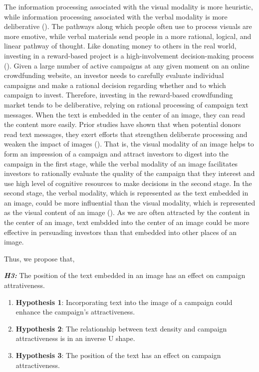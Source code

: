 \documentclass[a4paper]{article}
\begin{document}
The information processing associated with the visual modality is more heuristic, while information processing associated with the verbal modality is more deliberative (\cite{kim_effects_2008}). The pathways along which people often use to process visuals are more emotive, while verbal materials send people in a more rational, logical, and linear pathway of thought. Like donating money to others in the real world, investing in a reward-based project is a high-involvement decision-making process (\cite{zhao_multi-modal_2022}). Given a large number of active campaigns at any given moment on an online crowdfunding website, an investor needs to carefully evaluate individual campaigns and make a rational decision regarding whether and to which campaign to invest. Therefore, investing in the reward-based crowdfunding market tends to be deliberative, relying on rational processing of campaign text messages. When the text is embedded in the center of an image, they can read the content more easily. Prior studies have shown that when potential donors read text messages, they exert efforts that strengthen deliberate processing and weaken the impact of images (\cite{small_face_2009}). That is, the visual modality of an image helps to form an impression of a campaign and attract investors to digest into the campaign in the first stage, while the verbal modality of an image facilitates investors to rationally evaluate the quality of the campaign that they interest and use high level of cognitive resources to make decisions in the second stage. In the second stage, the verbal modality, which is represented as the text embedded in an image, could be more influential than the visual modality, which is represented as the visual content of an image (\cite{zhao_multi-modal_2022}). As we are often attracted by the content in the center of an image, text embdded into the center of an image could be more effective in persuading investors than that embedded into other places of an image. 

Thus, we propose that, 

\textit{\textbf{H3:}} The position of the text embedded in an image has an effect on campaign attrativeness.

\begin{enumerate}
    \item \textbf{Hypothesis 1}: Incorporating text into the image of a campaign could enhance the campaign's attractiveness. 
    \item  \textbf{Hypothesis 2}: The relationship between text density and campaign attractiveness is in an inverse U shape. 
    \item  \textbf{Hypothesis 3}: The position of the text has an effect on campaign attractiveness. 
\end{enumerate}
\end{document}
